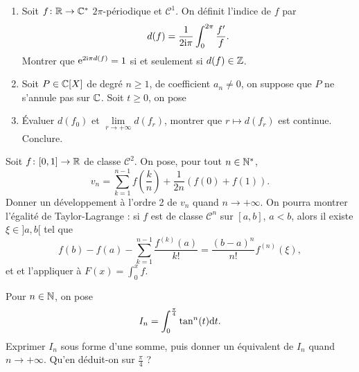 \begin{exercise}
    \phantom{}
    \begin{enumerate}
        \item Soit $f\colon\mathbb{R}\to\mathbb{C}^{*}$ $2\pi$-périodique et $\mathcal{C}^{1}$. On définit l'indice de $f$ par 
        \begin{equation}
            d(f)=\frac{1}{2\mathrm{i}\pi}\int_{0}^{2\pi}\frac{f'}{f}.
        \end{equation}
        Montrer que $\mathrm{e}^{2\mathrm{i}\pi d(f)}=1$ si et seulement si $d(f)\in\mathbb{Z}$.
        
        \item Soit $P\in\mathbb{C}[X]$ de degré $n\geqslant1$, de coefficient $a_n\neq0$, on suppose que $P$ ne s'annule pas sur $\mathbb{C}$. Soit $t\geqslant0$, on pose 
        \item Évaluer $d(f_{0})$ et $\lim\limits_{r\to+\infty}d(f_{r})$, montrer que $r\mapsto d(f_{r})$ est continue. Conclure.
    \end{enumerate}
\end{exercise}

\begin{exercise}
    Soit $f\colon[0,1]\to\mathbb{R}$ de classe $\mathcal{C}^{2}$. On pose, pour tout $n\in\mathbb{N}^{*}$,
    \begin{equation}
        v_n=\sum_{k=1}^{n-1}f\left(\frac{k}{n}\right)+\frac{1}{2n}\left(f(0)+f(1)\right).
    \end{equation}
    Donner un développement à l'ordre 2 de $v_n$ quand $n\to+\infty$. On pourra montrer l'égalité de Taylor-Lagrange : si $f$ est de classe $\mathcal{C}^{n}$ sur $[a,b]$, $a<b$, alors il existe $\xi\in]a,b[$ tel que 
    \begin{equation}
        f(b)-f(a)-\sum_{k=1}^{n-1}\frac{f^{(k)}(a)}{k!}=\frac{(b-a)^{n}}{n!}f^{(n)}(\xi),
    \end{equation}
    et et l'appliquer à $F(x)=\int_{0}^{x}f$.
\end{exercise}

\begin{exercise}
    Pour $n\in\mathbb{N}$, on pose 
    \begin{equation}
        I_n=\int_{0}^{\frac{\pi}{4}}\tan^{n}(t)\mathrm{d} t.
    \end{equation}
    Exprimer $I_n$ sous forme d'une somme, puis donner un équivalent de $I_n$ quand $n\to+\infty$. Qu'en déduit-on sur $\frac{\pi}{4}$ ?
\end{exercise}

